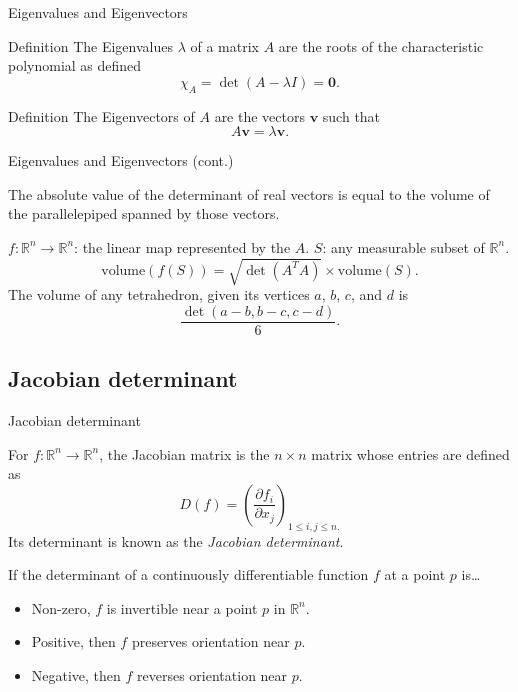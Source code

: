 \documentclass{beamer}
\begin{document}
\begin{frame}{Eigenvalues and Eigenvectors}

    \begin{block}{Definition}
        The Eigenvalues $\lambda$ of a matrix $A$ are the roots of the characteristic polynomial
        as defined
        \[
            \chi_A = \det(A - \lambda I) = \mathbf{0}.
        \]
    \end{block}


    \begin{block}{Definition}
        The Eigenvectors of $A$ are the vectors $\mathbf{v}$ such that
        \[
            A\mathbf{v} = \lambda \mathbf{v}.
        \]
    \end{block}

\end{frame}

\begin{frame}{Eigenvalues and Eigenvectors (cont.)}

    The absolute value of the determinant of real vectors is equal to the volume
    of the parallelepiped spanned by those vectors.

    $f : \mathbb{R}^n \to \mathbb{R}^n$: the linear map represented by the $A$.
    $S$: any measurable subset of $\mathbb{R}^n$.
    \[
        \text{volume}(f(S)) = \sqrt{\det{({A^T}A)}} \times \text{volume}(S).
    \]
    The volume of any tetrahedron, given its vertices $a$, $b$, $c$, and $d$ is
    \[
        \frac{\det(a - b, b - c, c - d)}{6}.
    \]

\end{frame}

\subsection{Jacobian determinant}

\begin{frame}{Jacobian determinant}

    For $f : \mathbb{R}^n \to \mathbb{R}^n$,
    the Jacobian matrix is the $n \times n$ matrix whose entries are defined as
    \[
        D(f) = {\left( \frac{\partial f_i}{\partial x_j} \right)}_{1 \leq i, j \leq n.}
    \]
    Its determinant is known as the \emph{Jacobian determinant}.


    \begin{exampleblock}{}
        If the determinant of a continuously differentiable function $f$ at a point $p$ is\dots
        \begin{itemize}
            \item Non-zero, $f$ is invertible near a point $p$ in $\mathbb{R}^n$.
            \item Positive, then $f$ preserves orientation near $p$.
            \item Negative, then $f$ reverses orientation near $p$.
        \end{itemize}
    \end{exampleblock}

\end{frame}
\end{document}
